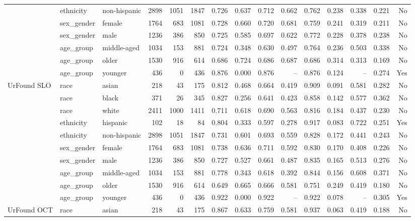 \begin{longtable}{@{}lllrrrrrrrrrrrr@{}}
 & ethnicity & non-hispanic & 2898 & 1051 & 1847 & 0.726 & 0.637 & 0.712 & 0.662 & 0.762 & 0.238 & 0.338 & 0.221 & No \\
 & sex\_gender & female & 1764 & 683 & 1081 & 0.728 & 0.660 & 0.720 & 0.681 & 0.759 & 0.241 & 0.319 & 0.211 & No \\
 & sex\_gender & male & 1236 & 386 & 850 & 0.725 & 0.585 & 0.697 & 0.622 & 0.772 & 0.228 & 0.378 & 0.238 & No \\
 & age\_group & middle-aged & 1034 & 153 & 881 & 0.724 & 0.348 & 0.630 & 0.497 & 0.764 & 0.236 & 0.503 & 0.338 & No \\
 & age\_group & older & 1530 & 916 & 614 & 0.686 & 0.724 & 0.686 & 0.687 & 0.686 & 0.314 & 0.313 & 0.169 & No \\
 & age\_group & younger & 436 & 0 & 436 & 0.876 & 0.000 & 0.876 & -- & 0.876 & 0.124 & -- & 0.274 & Yes \\
UrFound SLO & race & asian & 218 & 43 & 175 & 0.812 & 0.468 & 0.664 & 0.419 & 0.909 & 0.091 & 0.581 & 0.282 & No \\
 & race & black & 371 & 26 & 345 & 0.827 & 0.256 & 0.641 & 0.423 & 0.858 & 0.142 & 0.577 & 0.362 & No \\
 & race & white & 2411 & 1000 & 1411 & 0.711 & 0.618 & 0.690 & 0.563 & 0.816 & 0.184 & 0.437 & 0.230 & No \\
 & ethnicity & hispanic & 102 & 18 & 84 & 0.804 & 0.333 & 0.597 & 0.278 & 0.917 & 0.083 & 0.722 & 0.251 & Yes \\
 & ethnicity & non-hispanic & 2898 & 1051 & 1847 & 0.731 & 0.601 & 0.693 & 0.559 & 0.828 & 0.172 & 0.441 & 0.243 & No \\
 & sex\_gender & female & 1764 & 683 & 1081 & 0.738 & 0.636 & 0.711 & 0.592 & 0.830 & 0.170 & 0.408 & 0.226 & No \\
 & sex\_gender & male & 1236 & 386 & 850 & 0.727 & 0.527 & 0.661 & 0.487 & 0.835 & 0.165 & 0.513 & 0.276 & No \\
 & age\_group & middle-aged & 1034 & 153 & 881 & 0.778 & 0.343 & 0.618 & 0.392 & 0.844 & 0.156 & 0.608 & 0.371 & No \\
 & age\_group & older & 1530 & 916 & 614 & 0.649 & 0.665 & 0.666 & 0.581 & 0.751 & 0.249 & 0.419 & 0.180 & No \\
 & age\_group & younger & 436 & 0 & 436 & 0.922 & 0.000 & 0.922 & -- & 0.922 & 0.078 & -- & 0.305 & Yes \\
UrFound OCT & race & asian & 218 & 43 & 175 & 0.867 & 0.633 & 0.759 & 0.581 & 0.937 & 0.063 & 0.419 & 0.188 & No \\

\end{longtable}
